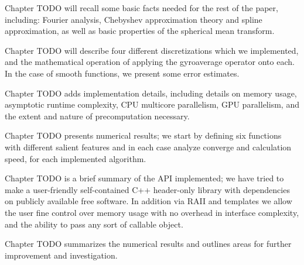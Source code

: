 Chapter TODO will recall some basic facts needed for the rest of the paper, including: Fourier analysis, Chebyshev approximation theory and spline approximation, as well as basic properties of the spherical mean transform.

Chapter TODO will describe four different discretizations which we implemented, and the mathematical operation of applying the gyroaverage operator onto each.  In the case of smooth functions, we present some error estimates.

Chapter TODO adds implementation details, including details on memory usage, asymptotic runtime complexity, CPU multicore parallelism, GPU parallelism, and the extent and nature of precomputation necessary.

Chapter TODO presents numerical results; we start by defining six functions with different salient features and in each case analyze converge and calculation speed, for each implemented algorithm.

Chapter TODO is a brief summary of the API implemented; we have tried to make a user-friendly self-contained C++ header-only library with dependencies on publicly available free software.  In addition via RAII and templates we allow the user fine control over memory usage with no overhead in interface complexity, and the ability to pass any sort of callable object.

Chapter TODO summarizes the numerical results and outlines areas for further improvement and investigation.

